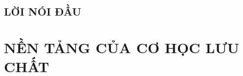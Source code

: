 \documentclass{book}
\begin{document}
\chapter*{LỜI NÓI ĐẦU}
	
\part{NỀN TẢNG CỦA CƠ HỌC LƯU CHẤT}
	
\end{document}
